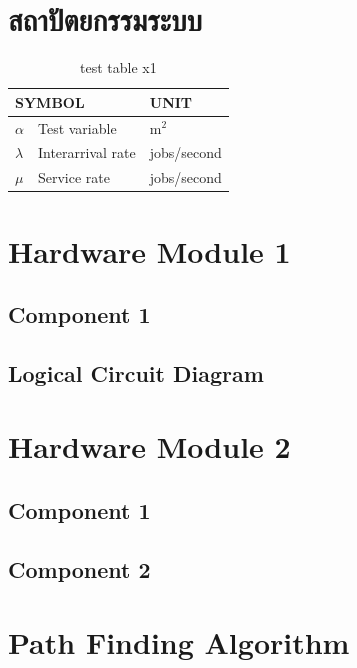 \documentclass[12pt,oneside,openright,a4paper]{cpe-thai-project}
\begin{document}
\section{สถาปัตยกรรมระบบ}

\begin{table}[!h]
\centering
\caption{test table x1}\label{tbl:symbols}
\begin{tabular}{@{}p{}|p{}p{}}\hline
\multicolumn{2}{l}{\textbf{SYMBOL}}  & \textbf{UNIT} \\ \hline 
$\alpha$ & Test variable\hfill & m$^2$ \\
$\lambda$ & Interarrival rate\hfill &  jobs/second\\
$\mu$ & Service rate\hfill & jobs/second \\ \hline
\end{tabular}
\end{table}



\section{Hardware Module 1}
\subsection{Component 1}
\subsection{Logical Circuit Diagram}

\section{Hardware Module 2}
\subsection{Component 1}
\subsection{Component 2}

\section{Path Finding Algorithm}
\end{document}
